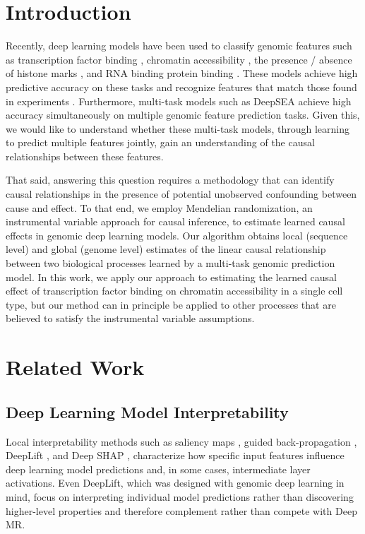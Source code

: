 \documentclass{article}
\begin{document}
\section{Introduction}
\label{introduction}
Recently, deep learning models have been used to classify genomic features such as transcription factor binding \cite{alipanahi2015predicting, zhou2015predicting}, chromatin accessibility \cite{zhou2015predicting, kelley2016basset}, the presence / absence of histone marks \cite{yin2019deephistone}, and RNA binding protein binding \cite{alipanahi2015predicting, pan2017rna, gandhi2018cdeepbind, zheng2018deep}. These models achieve high predictive accuracy on these tasks and recognize features that match those found in experiments . Furthermore, multi-task models such as DeepSEA  achieve high accuracy simultaneously on multiple genomic feature prediction tasks. Given this, we would like to understand whether these multi-task models, through learning to predict multiple features jointly, gain an understanding of the causal relationships between these features.

That said, answering this question requires a methodology that can identify causal relationships in the presence of potential unobserved confounding between cause and effect. To that end, we employ Mendelian randomization, an instrumental variable  approach for causal inference, to estimate learned causal effects in genomic deep learning models. Our algorithm obtains local (sequence level) and global (genome level) estimates of the linear causal relationship between two biological processes learned by a multi-task genomic prediction model. In this work, we apply our approach to estimating the learned causal effect of transcription factor binding on chromatin accessibility in a single cell type, but our method can in principle be applied to other processes that are believed to satisfy the instrumental variable assumptions.

\section{Related Work}
\subsection{Deep Learning Model Interpretability}
Local interpretability methods such as saliency maps \cite{simonyan2013deep}, guided back-propagation \cite{springenberg2014striving}, DeepLift \cite{shrikumar2017learning}, and Deep SHAP \cite{lundberg2017unified}, characterize how specific input features influence deep learning model predictions and, in some cases, intermediate layer activations. Even DeepLift, which was designed with genomic deep learning in mind, focus on interpreting individual model predictions rather than discovering higher-level properties and therefore complement rather than compete with Deep MR.
\end{document}
